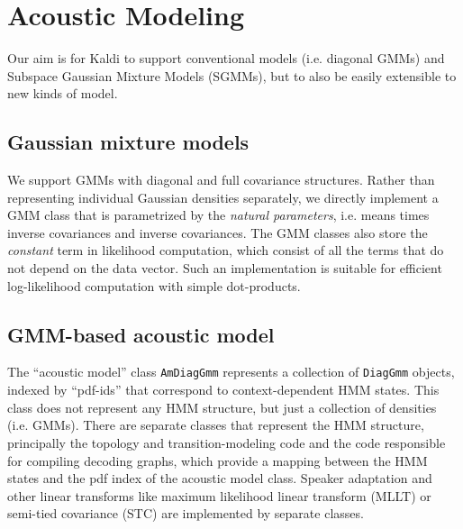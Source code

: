 \documentclass[10pt,conference,letterpaper]{IEEEtran}
\def \st {\small \tt}
\begin{document}
\section{Acoustic Modeling}
\label{sec:am}
Our aim is for Kaldi to support conventional models (i.e. diagonal GMMs) and 
Subspace Gaussian Mixture Models (SGMMs), but to also be easily extensible to 
new kinds of model. 

\subsection{Gaussian mixture models}
We support GMMs with diagonal and full covariance structures. Rather than 
representing individual Gaussian densities separately, we directly implement a 
GMM class that is parametrized by the {\em natural parameters}, i.e. means 
times inverse covariances and inverse covariances. The GMM classes also store 
the {\em constant} term in likelihood computation, which consist of all the 
terms that do not depend on the data vector. 
Such an implementation is suitable for efficient log-likelihood computation 
with simple dot-products. 

\subsection{GMM-based acoustic model}
The ``acoustic model'' class {\st AmDiagGmm} represents a collection of {\st DiagGmm} objects, indexed by ``pdf-ids'' that correspond to context-dependent
HMM states.   This class does not represent any HMM structure, but just a collection of densities (i.e. GMMs).
There are separate classes that represent the HMM structure, principally the 
topology and transition-modeling code and the code responsible for compiling 
decoding graphs, which provide a mapping between the HMM states and the pdf 
index of the acoustic model class.  
Speaker adaptation and other linear transforms like maximum likelihood linear 
transform (MLLT) \cite{mllt} or semi-tied covariance (STC) \cite{stc} are 
implemented by separate classes.
\end{document}

